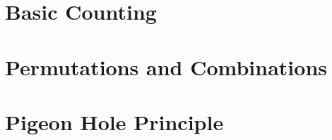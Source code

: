 \section{Basic Counting} 
    
\clearpage

\section{Permutations and Combinations}
    
\clearpage

\section{Pigeon Hole Principle}
    